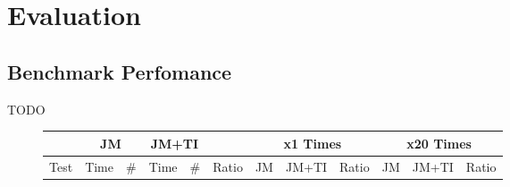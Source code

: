 
\section{Evaluation}

\subsection{Benchmark Perfomance}

TODO

\begin{figure*}
\begin{center}
\begin{tabular}{|l|r@{.}lr|r@{.}lr|r@{.}l|r@{.}lr@{.}l|r@{.}l|r@{.}lr@{.}l|r@{.}l|}

\hline

\hline

           & \multicolumn{3}{|c|}{JM}
           & \multicolumn{3}{|c|}{JM+TI}
           & \multicolumn{2}{|c|}{}
           & \multicolumn{6}{|c|}{x1 Times}
           & \multicolumn{6}{|c|}{x20 Times} \\
\hline
Test       & \multicolumn{2}{|c|}{Time} & \#
           & \multicolumn{2}{|c|}{Time} & \#
           & \multicolumn{2}{|c|}{Ratio}
           & \multicolumn{2}{|c|}{JM}
           & \multicolumn{2}{|c|}{JM+TI}
           & \multicolumn{2}{|c|}{Ratio}
           & \multicolumn{2}{|c|}{JM}
           & \multicolumn{2}{|c|}{JM+TI}
           & \multicolumn{2}{|c|}{Ratio} \\

\hline


\end{tabular}
\end{center}
\end{figure*}
